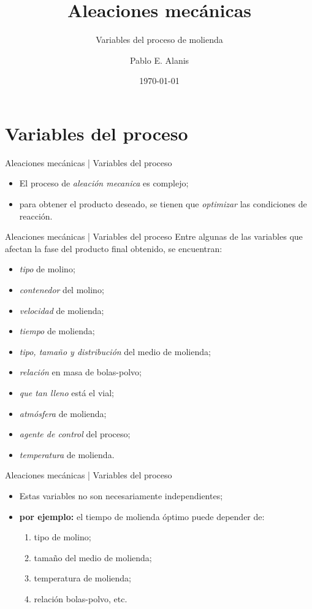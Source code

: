 \documentclass[%
spanish,
progressbar=head,
background=dark,
subsectionpage
]{beamer}
\title{Aleaciones mecánicas}
\subtitle{Variables del proceso de molienda}
\date{\today}
\author{Pablo E. Alanis}
\institute{Universidad Autónoma de Nuevo Leon, División de Posgrado\\Técnicas de preparación de materiales}
\begin{document}
\maketitle

\section{Variables del proceso}
\begin{frame}{Aleaciones mecánicas | Variables del proceso}
    \begin{itemize}
        \item El proceso de \emph{aleación mecanica} es complejo;
        \item para obtener el producto deseado, se tienen que \textit{optimizar} las condiciones de reacción.
    \end{itemize}
\end{frame}

\begin{frame}{Aleaciones mecánicas | Variables del proceso}
    Entre algunas de las variables que afectan la fase del producto final obtenido, se encuentran:

    \begin{itemize}
        \item \emph{tipo} de molino;
        \item \emph{contenedor} del molino;
        \item \emph{velocidad} de molienda;
        \item \emph{tiempo} de molienda;
        \item \emph{tipo, tamaño y distribución} del medio de molienda;
        \item \emph{relación} en masa de bolas-polvo;
        \item \emph{que tan lleno} está el vial;
        \item \emph{atmósfera} de molienda;
        \item \emph{agente de control} del proceso;
        \item \emph{temperatura} de molienda.
    \end{itemize}
\end{frame}

\begin{frame}{Aleaciones mecánicas | Variables del proceso}
\begin{itemize}
    \item Estas variables no son necesariamente independientes;\\
    \item[] \textbf{por ejemplo:} el tiempo de molienda óptimo puede depender de: 
    \begin{enumerate}
        \item tipo de molino;
        \item tamaño del medio de molienda;
        \item temperatura de molienda;
        \item relación bolas-polvo, etc.
    \end{enumerate}
\end{itemize}
\end{frame}
\end{document}
